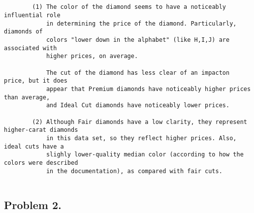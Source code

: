\documentclass[11pt]{article}
\begin{document}
    \begin{center}
    \end{center}
    { \hspace*{\fill} \\}
    
    \begin{center}
    \end{center}
    { \hspace*{\fill} \\}
    
    \begin{center}
    \end{center}
    { \hspace*{\fill} \\}
    
    \begin{Verbatim}[commandchars=\\\{\}]

        (1) The color of the diamond seems to have a noticeably influential role
            in determining the price of the diamond. Particularly, diamonds of
            colors "lower down in the alphabet" (like H,I,J) are associated with 
            higher prices, on average. 
            
            The cut of the diamond has less clear of an impacton price, but it does
            appear that Premium diamonds have noticeably higher prices than average,
            and Ideal Cut diamonds have noticeably lower prices.
        
        (2) Although Fair diamonds have a low clarity, they represent higher-carat diamonds 
            in this data set, so they reflect higher prices. Also, ideal cuts have a
            slighly lower-quality median color (according to how the colors were described 
            in the documentation), as compared with fair cuts.
        

    \end{Verbatim}

    \subsection*{Problem 2.}\label{problem-2.}
\end{document}
